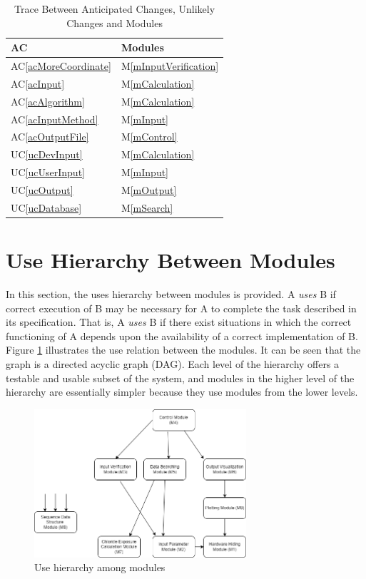\documentclass[12pt, titlepage]{article}
\newcommand{\acref}[1]{AC\ref{#1}}
\newcommand{\uref}[1]{UC\ref{#1}}
\newcommand{\mref}[1]{M\ref{#1}}
\begin{document}
\begin{table}[H]
\centering
\begin{tabular}{p{} p{}}
\toprule
\textbf{AC} & \textbf{Modules}\\
\midrule
\acref{acMoreCoordinate} & \mref{mInputVerification}\\
\acref{acInput} & \mref{mCalculation}\\
\acref{acAlgorithm} & \mref{mCalculation}\\
\acref{acInputMethod} & \mref{mInput}\\
\acref{acOutputFile} & \mref{mControl} \\
\uref{ucDevInput} & \mref{mCalculation}\\
\uref{ucUserInput} & \mref{mInput}\\
\uref{ucOutput} & \mref{mOutput}\\
\uref{ucDatabase} & \mref{mSearch}\\
\bottomrule
\end{tabular}
\caption{Trace Between Anticipated Changes, Unlikely Changes and Modules}
\label{TblACUCT}
\end{table}

\section{Use Hierarchy Between Modules} \label{SecUse}

In this section, the uses hierarchy between modules is
provided. A {\em uses} B if
correct execution of B may be necessary for A to complete the task described in
its specification. That is, A {\em uses} B if there exist situations in which
the correct functioning of A depends upon the availability of a correct
implementation of B.  Figure \ref{FigUH} illustrates the use relation between
the modules. It can be seen that the graph is a directed acyclic graph
(DAG). Each level of the hierarchy offers a testable and usable subset of the
system, and modules in the higher level of the hierarchy are essentially simpler
because they use modules from the lower levels.

\begin{figure}[H]
\centering
\includegraphics[width=0.7\textwidth]{UsesHierarchy.png}
\caption{Use hierarchy among modules}
\label{FigUH}
\end{figure}
\end{document}
